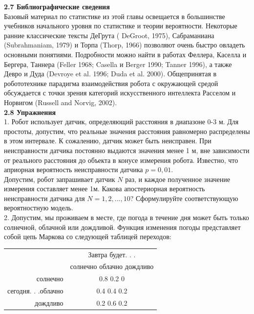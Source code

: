 \documentclass[10pt,a4paper]{article}
\begin{document}
 \textbf{2.7 Библиографические сведения}\\
 
 Базовый материал по статистике из этой главы освещается в большинстве учебников начального уровня по статистике и теории вероятности. Некоторые ранние классические тексты ДеГрута ( DeGroot, 1975), Сабраманиана (Subrahmaniam, 1979) и Торпа (Thorp, 1966) позволяют очень быстро овладеть основными понятиями. Подробности можно найти в работах Феллера, Каселла и Бергера, Таннера (Feller 1968; Casella и Berger 1990; Tanner 1996), а также Девро и Дуда (Devroye et al. 1996; Duda et al. 2000). Общепринятая в робототехнике парадигма взаимодействия робота с окружающей средой обсуждается с точки зрения категорий искусственного интеллекта Расселом и Норвигом (Russell and Norvig, 2002).\\

 \textbf{2.8 Упражнения}\\
 
 1. Робот использует датчик, определяющий расстояния в диапазоне 0-3 м. Для простоты, допустим, что реальные значения расстояния равномерно распределены в этом интервале. К сожалению, датчик может быть неисправен. При неисправности датчика постоянно выдаются значения менее 1 м, вне зависимости от реального расстояния до объекта в конусе измерения робота. Известно, что априорная вероятность неисправности датчика $p = 0,01$. \\
 Допустим, робот запрашивает датчик $N$ раз, и каждое полученное значение измерения составляет менее 1м. Какова апостериорная вероятность неисправности датчика для $N = 1, 2, . . . , 10$? Сформулируйте соответствующую вероятностную модель.\\
 2. Допустим, мы проживаем в месте, где погода в течение дня может быть только солнечной, облачной или дождливой. Функция изменения погоды представляет собой цепь Маркова со следующей таблицей переходов:\\
 \begin{table}[h]
 	\begin{center}
 		\begin{tabular}{|r|c|}
 			\hline
 			{} & Завтра будет. . . \\
 			{} & солнечно \hfill облачно \hfill дождливо \\
 			\hline
 			солнечно & 0.8\hspace{10mm} 0.2\hspace{10mm} 0 \\
 			сегодня. . .\hfill облачно &    0.4\hspace{10mm} 0.4\hspace{10mm} 0.2\\
 			дождливо & 0.2\hspace{10mm} 0.6\hspace{10mm} 0.2 \\
 			\hline
 		\end{tabular}
 	\end{center}
 \end{table}\\
{}\\
\end{document}

